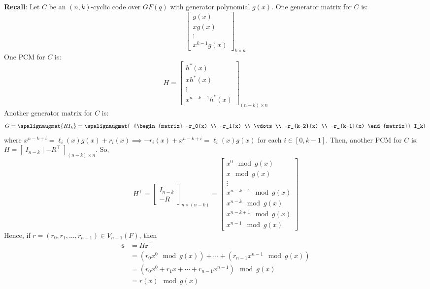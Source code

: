 \textbf{Recall}: Let $ C $ be an $ (n,k) $-cyclic code over $ GF(q) $ with generator
polynomial $ g(x) $. One generator matrix for $ C $ is:
\[
    \begin{bmatrix}
        g(x)   \\
        x g(x) \\
        \vdots \\
        x^{k-1}g(x)
    \end{bmatrix}_{k\times n} \]
One PCM for $ C $ is:
\[ H=
    \begin{bmatrix}
        h^*(x)   \\
        x h^*(x) \\
        \vdots   \\
        x^{n-k-1}h^*(x)
    \end{bmatrix}_{(n-k)\times n} \]
Another generator matrix for $ C $ is:
\[ G=\spalignaugmat{R I_k}=
    \spalignaugmat{
        {\begin{matrix}
                    -r_0(x)     \\
                    -r_1(x)     \\
                    \vdots      \\
                    -r_{k-2}(x) \\
                    -r_{k-1}(x)
                \end{matrix}}
        I_k}
\]
where $ x^{n-k+i}=\ell_i(x)g(x)+r_i(x)\implies -r_i(x)+x^{n-k+i}=\ell_i(x)g(x) $ for each $ i\in[0,k-1] $.
Then, another PCM for $ C $ is: $ H=\left[ \; I_{n-k}\mid -R^\top \; \right]_{(n-k)\times n} $. So,
\[ H^\top=
    \begin{bmatrix}
        I_{n-k} \\
        -R
    \end{bmatrix}_{n\times (n-k)}
    =
    \begin{bmatrix}
        x^0\mod g(x)       \\
        x \mod g(x)        \\
        \vdots             \\
        x^{n-k-1}\mod g(x) \\
        x^{n-k}\mod g(x)   \\
        x^{n-k+1}\mod g(x) \\
        x^{n-1}\mod g(x)
    \end{bmatrix} \]
Hence, if $ r=(r_0,r_1,\ldots ,r_{n-1})\in V_{n-1}(F) $, then
\begin{align*}
    \bm{s}
     & =H\bm{r}^\top                                        \\
     & =(r_0 x^0\mod g(x))+\cdots+(r_{n-1}x^{n-1}\mod g(x)) \\
     & =(r_0x^0+r_1x+\cdots+r_{n-1}x^{n-1})\mod g(x)        \\
     & =r(x)\mod g(x)
\end{align*}

